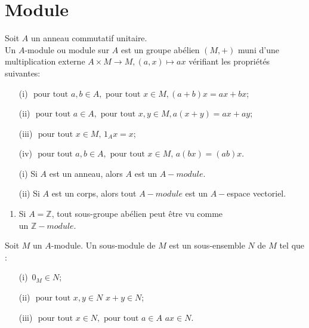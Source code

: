 \section{Module}
\begin{madefinition}
	Soit $A$ un anneau commutatif unitaire.\\
	Un $A$-module ou module sur $A$ est un groupe abélien $(M,+)$ muni d'une multiplication externe $A \times M \rightarrow M, (a,x) \mapsto ax$ vérifiant les propriétés suivantes:
	\begin{enumerate}
		\item[(i)]$ \text{ pour tout } a, b \in A, \text{ pour tout } x \in M,(a+b)x = ax+bx$;
		\item[(ii)] $ \text{ pour tout } a \in A, \text{ pour tout } x, y \in M,a(x+y) = ax+ay$;
		\item[(iii)] $ \text{ pour tout } x \in M, \,1_A x = x$;
		\item[(iv)] $\text{ pour tout } a, b \in A, \text{ pour tout } x \in M, \, a(bx)=(ab)x$.
	\end{enumerate}
\end{madefinition}
\begin{maremarque}
	\begin{enumerate}
		\item[(i)] Si $A$ est un anneau, alors $A$ est un $A-module$.
		\item[(ii)] Si $A$ est un corps, alors tout $A-module$ est un $A-$espace vectoriel.
	\end{enumerate}
\end{maremarque}
\begin{monexemple}
	\begin{enumerate}
		\item Si $A= \mathbb{Z}$, tout sous-groupe abélien peut être vu comme \\ un $\mathbb{Z}-module.$
	\end{enumerate}
\end{monexemple}
\begin{madefinition}
	Soit $M$ un $A$-module. Un sous-module de $M$ est un sous-ensemble $N$ de $M$ tel que :
	\begin{enumerate}
		\item[(i)]$ \, 0_M \in N$;
		\item[(ii)]$ \text{ pour tout } x, y \in N \, \, x+y \in N$;
		\item[(iii)] $\text{ pour tout } x \in N, \text{ pour tout } a \in A \, \, ax \in N$.
	\end{enumerate}
\end{madefinition}
